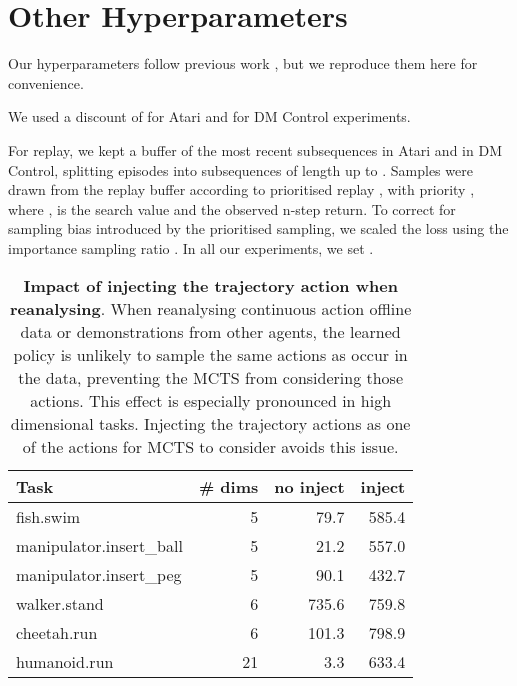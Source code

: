 \documentclass{article}
\begin{document}
\section{Other Hyperparameters}

Our hyperparameters follow previous work \cite{muzero, muzero_sampled}, but we reproduce them here for convenience.

We used a discount of  for Atari and  for DM Control experiments.

For replay, we kept a buffer of the most recent  subsequences in Atari and  in DM Control, splitting episodes into subsequences of length up to . Samples were drawn from the replay buffer according to prioritised replay \cite{Schaul2016}, with priority , where ,  is the search value and  the observed n-step return. To correct for sampling bias introduced by the prioritised sampling, we scaled the loss using the importance sampling ratio . In all our experiments, we set .


\begin{table}[h]
\begin{center}\begin{tabularx}{\columnwidth}{lr|rr}
\toprule
Task & \# dims & no inject & inject \\
\midrule
fish.swim & 5  & 79.7 & 585.4 \\
manipulator.insert\_ball & 5  & 21.2 & 557.0 \\
manipulator.insert\_peg & 5  & 90.1 & 432.7 \\
walker.stand & 6  & 735.6 & 759.8 \\
cheetah.run & 6  & 101.3 & 798.9 \\
humanoid.run & 21  & 3.3 & 633.4 \\
\bottomrule
\end{tabularx}
\end{center}
 \caption{
\label{tab:rl-unplugged-mujoco-inject}
\textbf{Impact of injecting the trajectory action when reanalysing}. When reanalysing continuous action offline data or demonstrations from other agents, the learned policy is unlikely to sample the same actions as occur in the data, preventing the MCTS from considering those actions. This effect is especially pronounced in high dimensional tasks. Injecting the trajectory actions as one of the actions for MCTS to consider avoids this issue.
}
\end{table}
\end{document}
